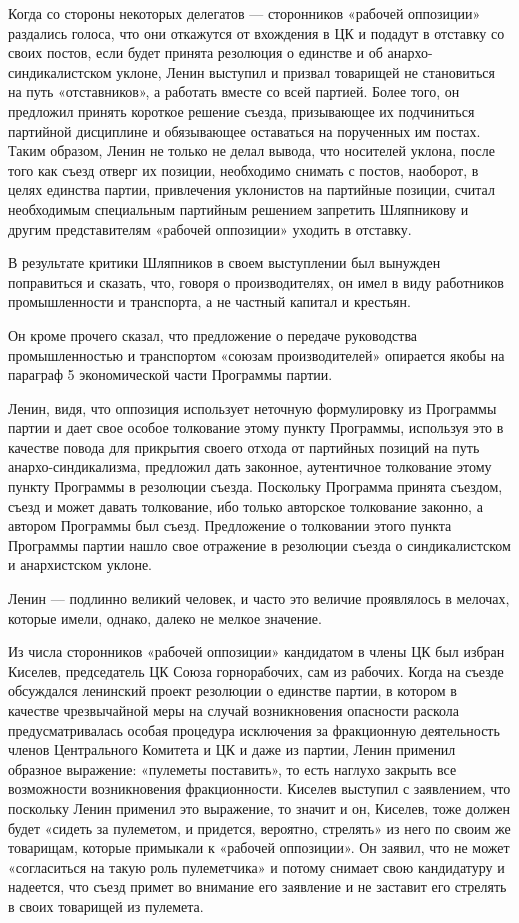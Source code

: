 \documentclass[12pt, a4paper, openany]{book}
\begin{document}
Когда со стороны некоторых делегатов — сторонников «рабочей оппозиции» раздались голоса, что они откажутся от вхождения в ЦК и подадут в отставку со своих постов, если будет принята резолюция о единстве и об анархо-синдикалистском уклоне, Ленин выступил и призвал товарищей не становиться на путь «отставников», а работать вместе со всей партией. Более того, он предложил принять короткое решение съезда, призывающее их подчиниться партийной дисциплине и обязывающее оставаться на порученных им постах. Таким образом, Ленин не только не делал вывода, что носителей уклона, после того как съезд отверг их позиции, необходимо снимать с постов, наоборот, в целях единства партии, привлечения уклонистов на партийные позиции, считал необходимым специальным партийным решением запретить Шляпникову и другим представителям «рабочей оппозиции» уходить в отставку.

В результате критики Шляпников в своем выступлении был вынужден поправиться и сказать, что, говоря о производителях, он имел в виду работников промышленности и транспорта, а не частный капитал и крестьян.

Он кроме прочего сказал, что предложение о передаче руководства промышленностью и транспортом «союзам производителей» опирается якобы на параграф 5 экономической части Программы партии.

Ленин, видя, что оппозиция использует неточную формулировку из Программы партии и дает свое особое толкование этому пункту Программы, используя это в качестве повода для прикрытия своего отхода от партийных позиций на путь анархо-синдикализма, предложил дать законное, аутентичное толкование этому пункту Программы в резолюции съезда. Поскольку Программа принята съездом, съезд и может давать толкование, ибо только авторское толкование законно, а автором Программы был съезд. Предложение о толковании этого пункта Программы партии нашло свое отражение в резолюции съезда о синдикалистском и анархистском уклоне.

Ленин — подлинно великий человек, и часто это величие проявлялось в мелочах, которые имели, однако, далеко не мелкое значение.

Из числа сторонников «рабочей оппозиции» кандидатом в члены ЦК был избран Киселев, председатель ЦК Союза горнорабочих, сам из рабочих. Когда на съезде обсуждался ленинский проект резолюции о единстве партии, в котором в качестве чрезвычайной меры на случай возникновения опасности раскола предусматривалась особая процедура исключения за фракционную деятельность членов Центрального Комитета и ЦК и даже из партии, Ленин применил образное выражение: «пулеметы поставить», то есть наглухо закрыть все возможности возникновения фракционности. Киселев выступил с заявлением, что поскольку Ленин применил это выражение, то значит и он, Киселев, тоже должен будет «сидеть за пулеметом, и придется, вероятно, стрелять» из него по своим же товарищам, которые примыкали к «рабочей оппозиции». Он заявил, что не может «согласиться на такую роль пулеметчика» и потому снимает свою кандидатуру и надеется, что съезд примет во внимание его заявление и не заставит его стрелять в своих товарищей из пулемета.
\end{document}

